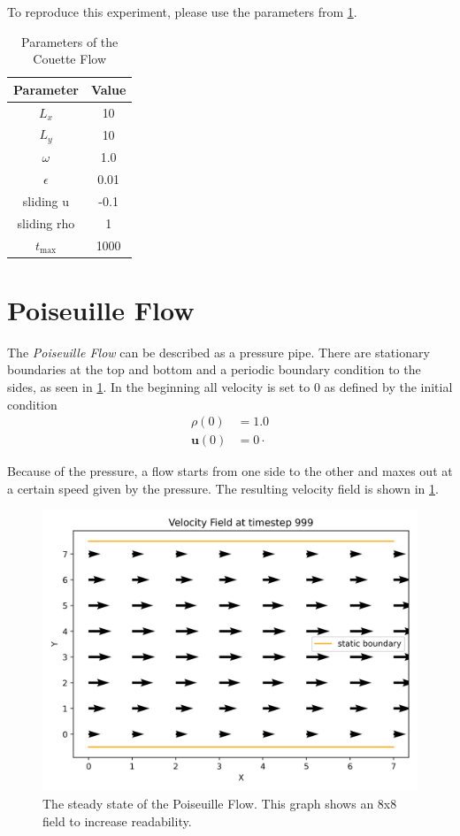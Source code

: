 To reproduce this experiment, please use the parameters from \cref{tab:cf-parameters}.

\begin{table}[H]
    \centering %
    \begin{tabular}{c c}
        \hline\hline %
        Parameter   & Value \\ [0.5ex] %
        \hline %
        $L_x$       & 10    \\
        $L_y$       & 10    \\
        $\omega$    & 1.0   \\
        $\epsilon$  & 0.01  \\
        sliding u   & -0.1  \\
        sliding rho & 1     \\
        $t_{\max}$  & 1000  \\ [1ex] %
        \hline %
    \end{tabular}
    \caption{Parameters of the Couette Flow} %
    \label{tab:cf-parameters}
\end{table}


\section{Poiseuille Flow}
The \textit{Poiseuille Flow} can be described as a pressure pipe.
There are stationary boundaries at the top and bottom and a periodic boundary condition to the sides, as seen in \cref{fig:pf-velocity-field}.
In the beginning all velocity is set to 0 as defined by the initial condition
\begin{equation*}
    \begin{aligned}
        \rho(0) &= 1.0 \\
        \mathbf{u}(0) &= 0 \cdot
    \end{aligned}
\end{equation*}

Because of the pressure, a flow starts from one side to the other and maxes out at a certain speed given by the pressure.
The resulting velocity field is shown in \cref{fig:pf-velocity-field}.
\begin{figure}[H]
    \begin{center}
        \includegraphics[width=0.5\linewidth]{graphs/PoiseuilleFlow/velocity_field_999}
        \caption{The steady state of the Poiseuille Flow. This graph shows an 8x8 field to increase readability.}
        \label{fig:pf-velocity-field}
    \end{center}
\end{figure}

